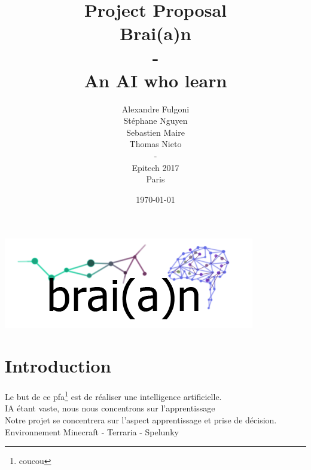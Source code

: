 \documentclass{article}
\begin{document}
\title{Project Proposal \\
      Brai(a)n \\
      - \\
      An AI who learn}
\author{Alexandre Fulgoni \\
        Stéphane Nguyen \\
        Sebastien Maire \\
        Thomas Nieto \\
        - \\
        Epitech 2017 \\
        Paris \\
}


\date{\today}
\maketitle
\begin{center}
  \includegraphics[scale=0.5]{braian}
\end{center}

\clearpage

\section{Introduction}
  Le but de ce pfa\footnote{coucou} est de réaliser une intelligence artificielle. \\
  IA étant vaste, nous nous concentrons sur l’apprentissage \\
  Notre projet se concentrera sur l’aspect apprentissage et prise de décision.
  Environnement Minecraft - Terraria - Spelunky
\end{document}
